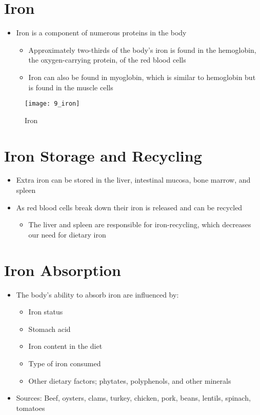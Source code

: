 \documentclass[title={Chapter 9}]{fdsn201notes}
\begin{document}
\section{Iron}\label{sec:Iron}
\begin{itemize}
	\item Iron is a component of numerous proteins in the body
	\begin{itemize}
		\item Approximately two-thirds of the body’s iron is found in the hemoglobin, the oxygen-carrying protein, of the red blood cells
		\item Iron can also be found in myoglobin, which is similar to hemoglobin but is found in the muscle cells
	\end{itemize}
\end{itemize}

\begin{figure}[H]
	\centering
	\texttt{[image: 9\_iron]}
	\caption{Iron}
	\label{fig:iron}
\end{figure}

\section{Iron Storage and Recycling}\label{sec:iron-storage-and-recycling}
\begin{itemize}
	\item Extra iron can be stored in the liver, intestinal mucosa, bone marrow, and spleen
	\item As red blood cells break down their iron is released and can be recycled
	\begin{itemize}
		\item The liver and spleen are responsible for iron-recycling, which decreases our need for dietary iron
	\end{itemize}
\end{itemize}

\section{Iron Absorption}\label{sec:iron-absorption}
\begin{itemize}
	\item The body’s ability to absorb iron are influenced by:
	\begin{itemize}
		\item Iron status
		\item Stomach acid
		\item Iron content in the diet
		\item Type of iron consumed
		\item Other dietary factors; phytates, polyphenols, and other minerals
	\end{itemize}
	\item Sources: Beef, oysters, clams, turkey, chicken, pork, beans, lentils, spinach, tomatoes
\end{itemize}
\end{document}

